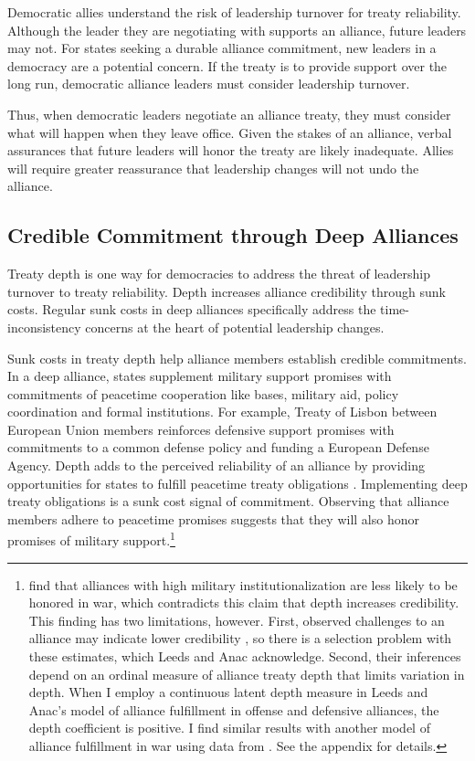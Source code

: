 \documentclass[12pt]{article}
\begin{document}
Democratic allies understand the risk of leadership turnover for treaty reliability. 
Although the leader they are negotiating with supports an alliance, future leaders may not. 
For states seeking a durable alliance commitment, new leaders in a democracy are a potential concern. 
If the treaty is to provide support over the long run, democratic alliance leaders must consider leadership turnover.


Thus, when democratic leaders negotiate an alliance treaty, they must consider what will happen when they leave office.
Given the stakes of an alliance, verbal assurances that future leaders will honor the treaty are likely inadequate.
Allies will require greater reassurance that leadership changes will not undo the alliance. 



\subsection{Credible Commitment through Deep Alliances}

Treaty depth is one way for democracies to address the threat of leadership turnover to treaty reliability. 
Depth increases alliance credibility through sunk costs.
Regular sunk costs in deep alliances specifically address the time-inconsistency concerns at the heart of potential leadership changes.


Sunk costs in treaty depth help alliance members establish credible commitments.
In a deep alliance, states supplement military support promises with commitments of peacetime cooperation like bases, military aid, policy coordination and formal institutions. 
For example, Treaty of Lisbon between European Union members reinforces defensive support promises with commitments to a common defense policy and funding a European Defense Agency. 
Depth adds to the perceived reliability of an alliance by providing opportunities for states to fulfill peacetime treaty obligations \citep{Morrow1994}. 
Implementing deep treaty obligations is a sunk cost signal of commitment.
Observing that alliance members adhere to peacetime promises suggests that they will also honor promises of military support.\footnote{\citet{LeedsAnac2005} find that alliances with high military institutionalization are less likely to be honored in war, which contradicts this claim that depth increases credibility. 
This finding has two limitations, however. 
First, observed challenges to an alliance may indicate lower credibility \citep{Smith1995}, so there is a selection problem with these estimates, which Leeds and Anac acknowledge. 
Second, their inferences depend on an ordinal measure of alliance treaty depth that limits variation in depth. 
When I employ a continuous latent depth measure in Leeds and Anac's model of alliance fulfillment in offense and defensive alliances, the depth coefficient is positive. 
I find similar results with another model of alliance fulfillment in war using data from \citet{BerkemeierFuhrmann2018}.
See the appendix for details.} 
\end{document}
